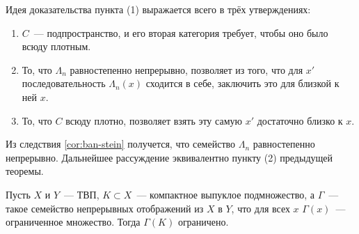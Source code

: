 \documentclass{notes}
\begin{document}
	\begin{rem}
		Идея доказательства пункта (1) выражается всего в трёх утверждениях:
		\begin{enumerate}
			\item $C$~--- подпространство, и его вторая категория требует, чтобы оно было всюду плотным.
			\item То, что $\Lambda_n$ равностепенно непрерывно, позволяет из того, что для $x'$ последовательность $\Lambda_n(x)$ сходится в себе, заключить это для близкой к ней $x$. 
			\item То, что $C$ всюду плотно, позволяет взять эту самую $x'$ достаточно близко к $x$.
 		\end{enumerate}
	\end{rem}

	\begin{thm} \label{thm:lim-cont-1}
		Из следствия \ref{cor:ban-stein} получется, что семейство $\Lambda_n$ равностепенно непрерывно. Дальнейшее рассуждение эквивалентно пункту (2) предыдущей теоремы.
	\end{thm}

	\begin{thm}
		Пусть $X$ и $Y$~--- ТВП, $K \subset X$~--- компактное выпуклое подмножество, а $\Gamma$~--- такое семейство непрерывных отображений из $X$ в $Y$, что для всех $x$ $\Gamma(x)$~--- ограниченное множество. Тогда $\Gamma(K)$ ограничено.
	\end{thm}
\end{document}
